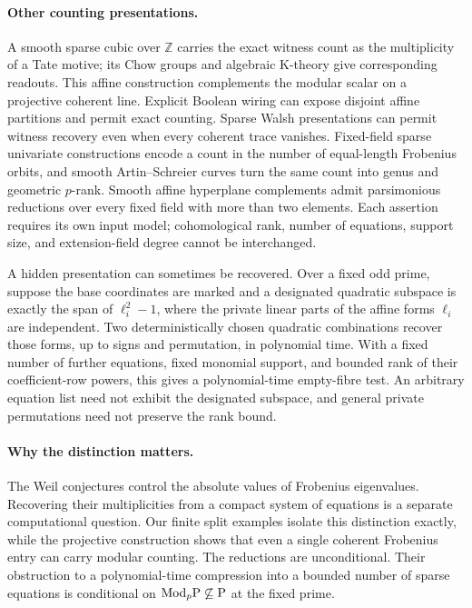 \paragraph{Other counting presentations.}
A smooth sparse cubic over $\mathbb Z$ carries the exact witness count as the multiplicity of a Tate motive; its Chow groups and algebraic K-theory give corresponding readouts. This affine construction complements the modular scalar on a projective coherent line. Explicit Boolean wiring can expose disjoint affine partitions and permit exact counting. Sparse Walsh presentations can permit witness recovery even when every coherent trace vanishes. Fixed-field sparse univariate constructions encode a count in the number of equal-length Frobenius orbits, and smooth Artin--Schreier curves turn the same count into genus and geometric $p$-rank. Smooth affine hyperplane complements admit parsimonious reductions over every fixed field with more than two elements. Each assertion requires its own input model; cohomological rank, number of equations, support size, and extension-field degree cannot be interchanged.

A hidden presentation can sometimes be recovered. Over a fixed odd prime, suppose the base coordinates are marked and a designated quadratic subspace is exactly the span of $\ell_i^2-1$, where the private linear parts of the affine forms $\ell_i$ are independent. Two deterministically chosen quadratic combinations recover those forms, up to signs and permutation, in polynomial time. With a fixed number of further equations, fixed monomial support, and bounded rank of their coefficient-row powers, this gives a polynomial-time empty-fibre test. An arbitrary equation list need not exhibit the designated subspace, and general private permutations need not preserve the rank bound.

\paragraph{Why the distinction matters.}
The Weil conjectures control the absolute values of Frobenius eigenvalues. Recovering their multiplicities from a compact system of equations is a separate computational question. Our finite split examples isolate this distinction exactly, while the projective construction shows that even a single coherent Frobenius entry can carry modular counting. The reductions are unconditional. Their obstruction to a polynomial-time compression into a bounded number of sparse equations is conditional on $\mathrm{Mod}_p\mathrm P\not\subseteq\mathrm P$ at the fixed prime.

